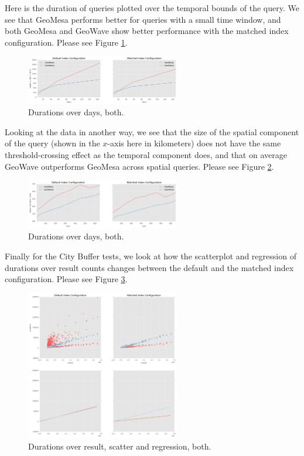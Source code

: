 Here is the duration of queries plotted over the temporal bounds of the query.
We see that GeoMesa performs better for queries with a small time window,
and both GeoMesa and GeoWave show better performance with the matched index configuration.
Please see Figure \ref{durationdaysboth}.

\begin{figure}[h!tb]
  \centering
  \includegraphics[width=0.60\textwidth]{../docs/img/gdelt/duration-over-days-default-and-matching.png}
  \caption{Durations over days, both.}
  \label{durationdaysboth}
\end{figure}

Looking at the data in another way, we see that the size of the spatial component of the query
(shown in the $x$-axis here in kilometers)
does not have the same threshold-crossing effect as the temporal component does,
and that on average GeoWave outperforms GeoMesa across spatial queries.
Please see Figure \ref{durationsize}.

\begin{figure}[h!tb]
  \centering
  \includegraphics[width=0.60\textwidth]{../docs/img/gdelt/duration-over-size-default-and-matching.png}
  \caption{Durations over days, both.}
  \label{durationsize}
\end{figure}

Finally for the City Buffer tests, we look at how the scatterplot and regression
of durations over result counts changes between the default and the matched index configuration.
Please see Figure \ref{durationresult}.

\begin{figure}[h!tb]
  \centering
  \includegraphics[width=0.60\textwidth]{../docs/img/gdelt/duration-over-result-default-and-matching.png}
  \caption{Durations over result, scatter and regression, both.}
  \label{durationresult}
\end{figure}

